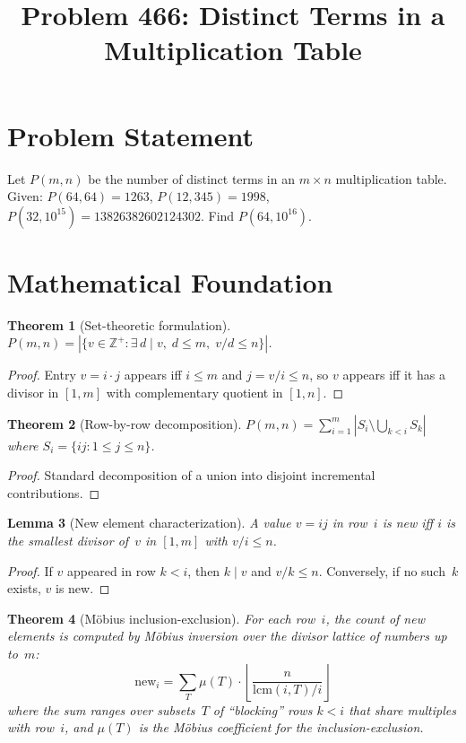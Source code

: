\documentclass[11pt]{article}
\title{Problem 466: Distinct Terms in a Multiplication Table}
\author{}
\date{}
\newtheorem{theorem}{Theorem}
\newtheorem{lemma}[theorem]{Lemma}
\begin{document}
\maketitle

\section{Problem Statement}

Let $P(m, n)$ be the number of distinct terms in an $m \times n$ multiplication table. Given: $P(64, 64) = 1263$, $P(12, 345) = 1998$, $P(32, 10^{15}) = 13826382602124302$. Find $P(64, 10^{16})$.

\section{Mathematical Foundation}

\begin{theorem}[Set-theoretic formulation]
\label{thm:set}
$P(m, n) = |\{v \in \mathbb{Z}^+ : \exists\, d \mid v,\; d \le m,\; v/d \le n\}|$.
\end{theorem}

\begin{proof}
Entry $v = i \cdot j$ appears iff $i \le m$ and $j = v/i \le n$, so $v$ appears iff it has a divisor in $[1, m]$ with complementary quotient in $[1, n]$.
\end{proof}

\begin{theorem}[Row-by-row decomposition]
\label{thm:row}
$P(m, n) = \sum_{i=1}^{m} |S_i \setminus \bigcup_{k<i} S_k|$ where $S_i = \{ij : 1 \le j \le n\}$.
\end{theorem}

\begin{proof}
Standard decomposition of a union into disjoint incremental contributions.
\end{proof}

\begin{lemma}[New element characterization]
\label{lem:new}
A value $v = ij$ in row~$i$ is new iff $i$ is the smallest divisor of~$v$ in $[1, m]$ with $v/i \le n$.
\end{lemma}

\begin{proof}
If $v$ appeared in row $k < i$, then $k \mid v$ and $v/k \le n$. Conversely, if no such~$k$ exists, $v$ is new.
\end{proof}

\begin{theorem}[M\"obius inclusion-exclusion]
\label{thm:mobius}
For each row~$i$, the count of new elements is computed by M\"obius inversion over the divisor lattice of numbers up to~$m$:
\[
\mathrm{new}_i = \sum_{T} \mu(T) \cdot \left\lfloor \frac{n}{\mathrm{lcm}(i, T)/i} \right\rfloor
\]
where the sum ranges over subsets~$T$ of ``blocking'' rows $k < i$ that share multiples with row~$i$, and $\mu(T)$ is the M\"obius coefficient for the inclusion-exclusion.
\end{theorem}
\end{document}
